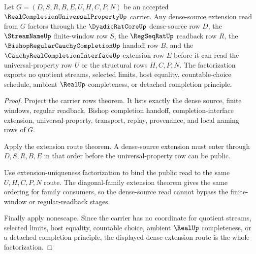 \begin{theorem}
\label{thm:real-completion-universal-property-dense-extension-factorization}
Let $G=(D,S,R,B,E,U,H,C,P,N)$ be an accepted $\RealCompletionUniversalPropertyUp$ carrier. Any dense-source extension read from $G$ factors through the $\DyadicRatCoreUp$ dense-source row $D$, the $\StreamNameUp$ finite-window row $S$, the $\RegSeqRatUp$ readback row $R$, the $\BishopRegularCauchyCompletionUp$ handoff row $B$, and the $\CauchyRealCompletionInterfaceUp$ extension row $E$ before it can read the universal-property row $U$ or the structural rows $H,C,P,N$. The factorization exports no quotient streams, selected limits, host equality, countable-choice schedule, ambient $\RealUp$ completeness, or detached completion principle.
\end{theorem}
\begin{proof}
Project the carrier rows theorem. It lists exactly the dense source, finite windows, regular readback, Bishop completion handoff, completion-interface extension, universal-property, transport, replay, provenance, and local naming rows of $G$.

Apply the extension route theorem. A dense-source extension must enter through $D,S,R,B,E$ in that order before the universal-property row can be public.

Use extension-uniqueness factorization to bind the public read to the same $U,H,C,P,N$ route. The diagonal-family extension theorem gives the same ordering for family consumers, so the dense-source read cannot bypass the finite-window or regular-readback stages.

Finally apply nonescape. Since the carrier has no coordinate for quotient streams, selected limits, host equality, countable choice, ambient $\RealUp$ completeness, or a detached completion principle, the displayed dense-extension route is the whole factorization.
\end{proof}


